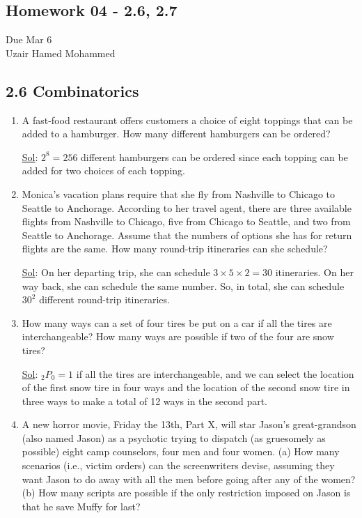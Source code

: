 \begin{center}
  \section*{Homework 04 - 2.6, 2.7}
  Due Mar 6 \\
  Uzair Hamed Mohammed
\end{center}


\subsection*{2.6 Combinatorics}
\begin{enumerate}
  \item[6.] A fast-food restaurant offers customers a choice of eight
    toppings that can be added to a hamburger. How many different
    hamburgers can be ordered?

    \underline{Sol}: \(\boxed{2^8 = 256}\) different hamburgers can be
    ordered since each topping can be added for two choices of each topping.

  \item[16.] Monica’s vacation plans require that she fly from
    Nashville to Chicago to Seattle to Anchorage. According to her
    travel agent, there are three available flights from Nashville to
    Chicago, five from Chicago to Seattle, and two from Seattle to
    Anchorage. Assume that the numbers of options she has for return
    flights are the same. How many round-trip itineraries can she schedule?

    \underline{Sol}: On her departing trip, she can schedule \(3
    \times 5 \times 2 = 30\) itineraries. On her way back, she can
    schedule the same number. So, in total, she can schedule \(\boxed{30^2}\)
    different round-trip itineraries.

  \item[18.] How many ways can a set of four tires be put on a car if
    all the tires are interchangeable? How many ways are possible if
    two of the four are snow tires?

    \underline{Sol}: \(_2 P_0 = 1\) if all the tires are
    interchangeable, and we can select the location of the first snow
    tire in four ways and the location of the second snow tire in
    three ways to make a total of 12 ways in the second part.

  \item[26.] A new horror movie, Friday the 13th, Part X, will star
    Jason’s great-grandson (also named Jason) as a psychotic trying
    to dispatch (as gruesomely as possible) eight camp counselors,
    four men and four women. (a) How many scenarios (i.e., victim
    orders) can the screenwriters devise, assuming they want Jason to
    do away with all the men before going after any of the women? (b)
    How many scripts are possible if the only restriction imposed on
    Jason is that he save Muffy for last?


\end{enumerate}
